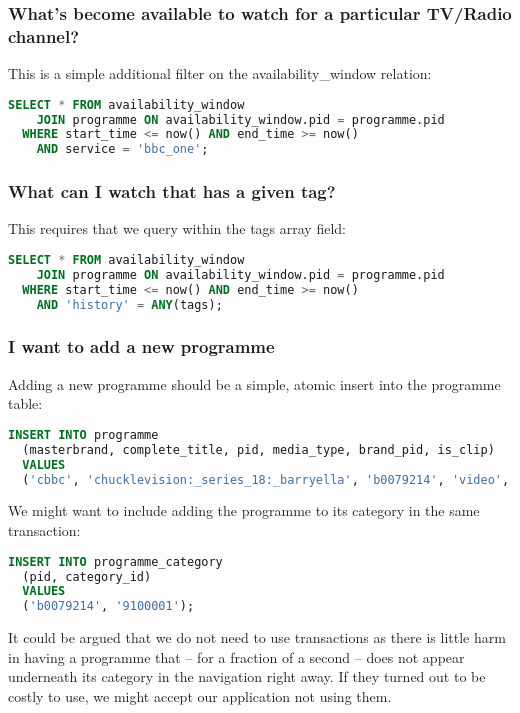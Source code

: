 \documentclass[11pt,a4paper]{article}
\begin{document}
\subsubsection{What's become available to watch for a particular TV/Radio channel?}

This is a simple additional filter on the availability\_window relation:

\begin{lstlisting}[language=SQL]
  SELECT * FROM availability_window
    JOIN programme ON availability_window.pid = programme.pid
  WHERE start_time <= now() AND end_time >= now()
    AND service = 'bbc_one';
\end{lstlisting}

\subsubsection{What can I watch that has a given tag?}

This requires that we query within the tags array field:

\begin{lstlisting}[language=SQL]
  SELECT * FROM availability_window
    JOIN programme ON availability_window.pid = programme.pid
  WHERE start_time <= now() AND end_time >= now()
    AND 'history' = ANY(tags);
\end{lstlisting}

\subsubsection{I want to add a new programme}

Adding a new programme should be a simple, atomic insert into the programme
table:

\begin{lstlisting}[language=SQL]
  INSERT INTO programme
  (masterbrand, complete_title, pid, media_type, brand_pid, is_clip)
  VALUES
  ('cbbc', 'chucklevision:_series_18:_barryella', 'b0079214', 'video', 'b006w487', '0');
\end{lstlisting}

We might want to include adding the programme to its category in the same
transaction:

\begin{lstlisting}[language=SQL]
  INSERT INTO programme_category
  (pid, category_id)
  VALUES
  ('b0079214', '9100001');
\end{lstlisting}

It could be argued that we do not need to use transactions as there is
little harm in having a programme that -- for a fraction of a second --
does not appear underneath its category in the navigation right away. If
they turned out to be costly to use, we might accept our application
not using them.
\end{document}
